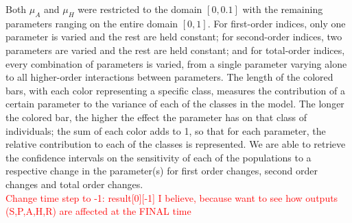 \documentclass[12pt]{article}
\begin{document}
Both $\mu_{A}$ and $\mu_{H}$ were restricted to the domain $[0,0.1]$ with the remaining parameters ranging on the entire domain $[0,1]$. For first-order indices, only one parameter is varied and the rest are held constant; for second-order indices, two parameters are varied and the rest are held constant; and for total-order indices, every combination of parameters is varied, from a single parameter varying alone to all higher-order interactions between parameters. The length of the colored bars, with each color representing a specific class, measures the contribution of a certain parameter to the variance of each of the classes in the model. The longer the colored bar, the higher the effect the parameter has on that class of individuals; the sum of each color adds to 1, so that for each parameter, the relative contribution to each of the classes is represented. We are able to retrieve the confidence intervals on the sensitivity of each of the populations to a respective change in the parameter(s) for first order changes, second order changes and total order changes. \\
\textcolor{red}{Change time step to -1: result[0][-1] I believe, because want to see how outputs (S,P,A,H,R) are affected at the FINAL time}


\pagebreak



\end{document}
